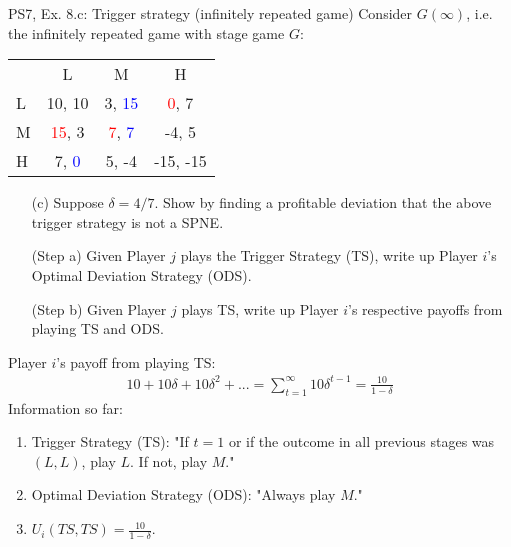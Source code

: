 \begin{frame}{PS7, Ex. 8.c: Trigger strategy (infinitely repeated game)}
    Consider $G(\infty)$, i.e. the infinitely repeated game with stage game $G$: \vspace{-6pt}
    \begin{table}
      \begin{tabular}{l|c|c|c|}
        \multicolumn{1}{c}{} & \multicolumn{1}{c}{L} & \multicolumn{1}{c}{M} & \multicolumn{1}{c}{H} \\\cline{2-4}
        L & 10, 10 & 3, \textcolor{blue}{15} & \textcolor{red}{0}, 7 \\\cline{2-4}
        M & \textcolor{red}{15}, 3 & \textcolor{red}{7}, \textcolor{blue}{7} & -4, 5 \\\cline{2-4}
        H & 7, \textcolor{blue}{0} & 5, -4 & -15, -15 \\\cline{2-4}
      \end{tabular}
    \end{table}
    \begin{itemize}
      \vspace{-4pt} \item[(c)] Suppose $\delta = 4/7$. Show by finding a profitable deviation that the above trigger strategy is not a SPNE. \vspace{-6pt}
    \end{itemize}
  \begin{multicols}{2}
    \begin{itemize}
      \item[(Step a)] Given Player $j$ plays the Trigger Strategy (TS), write up Player $i$'s Optimal Deviation Strategy (ODS).
      \item[(Step b)] Given Player $j$ plays TS, write up Player $i$'s respective payoffs from playing TS and ODS.
    \end{itemize}
    Player $i$'s payoff from playing TS:
    \begin{align*}
      10+10\delta+10\delta^2+...=\sum_{t=1}^\infty10\delta^{t-1}=\frac{10}{1-\delta}
    \end{align*}
    \vfill\null\columnbreak
    Information so far:
    \begin{enumerate}
      \item Trigger Strategy (TS): "If $t=1$ or if the outcome in all previous stages was $(L,L)$, play $L$. If not, play $M$."
      \item Optimal Deviation Strategy (ODS): "Always play $M$."
      \item $U_i(TS,TS)=\frac{10}{1-\delta}$.
    \end{enumerate}
    \vfill\null
  \end{multicols}
\end{frame}
